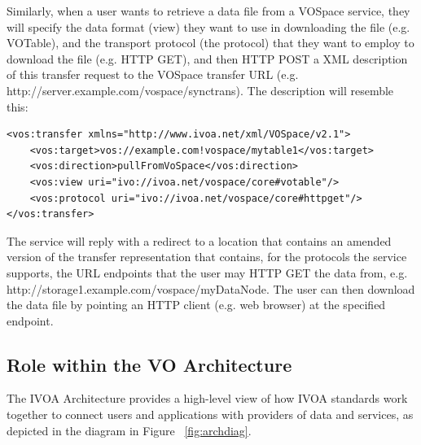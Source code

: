 \documentclass[11pt,a4paper]{ivoa}
\begin{document}
Similarly, when a user wants to retrieve a data file from a VOSpace service, they will specify the data format (view) they want to use in downloading the file (e.g. VOTable), and the transport protocol (the protocol) that they want to employ to download the file (e.g. HTTP GET), and then HTTP POST a XML description of this transfer request to the VOSpace transfer URL (e.g. http://server.example.com/vospace/synctrans). The description will resemble this:

\begin{lstlisting}
<vos:transfer xmlns="http://www.ivoa.net/xml/VOSpace/v2.1">
    <vos:target>vos://example.com!vospace/mytable1</vos:target>
    <vos:direction>pullFromVoSpace</vos:direction> 
    <vos:view uri="ivo://ivoa.net/vospace/core#votable"/> 
    <vos:protocol uri="ivo://ivoa.net/vospace/core#httpget"/>  
</vos:transfer>
\end{lstlisting}

The service will reply with a redirect to a location that contains an amended version of the transfer representation that contains, for the protocols the service supports, the URL endpoints that the user may HTTP GET the data from, e.g. http://storage1.example.com/vospace/myDataNode. The user can then download the data file by pointing an HTTP client (e.g. web browser) at the specified endpoint.

\subsection{Role within the VO Architecture}
\label{subsec:role within the vo architecture}

The IVOA Architecture \citep{note:VOARCH} provides a high-level view of how IVOA standards work together to connect users and applications with providers of data and services, as depicted in the diagram in Figure ~\ref{fig:archdiag}.
\end{document}
